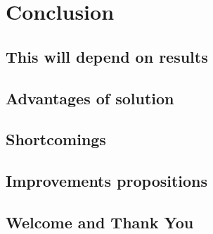 
\chapter{Conclusion} %

\label{Conclusion} %




\section{This will depend on results}
\section{Advantages of solution}
\section{Shortcomings}
\section{Improvements propositions}

\section{Welcome and Thank You}
